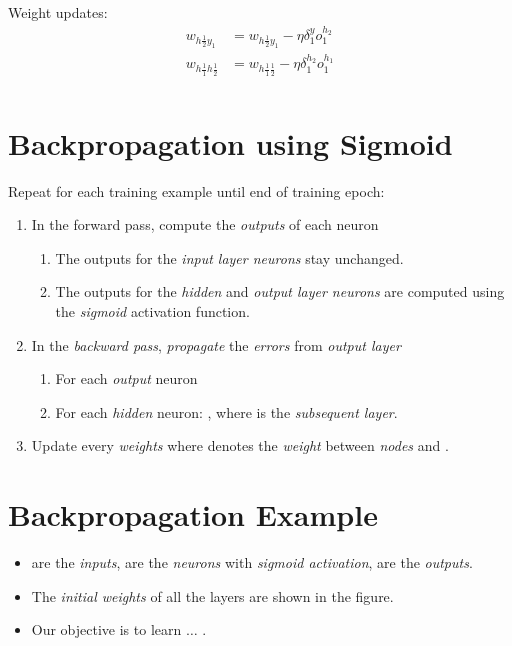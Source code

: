 \documentclass[
	number={8},
	title={Artificial Neural Network}
]{cs584notes}
\begin{document}
Weight updates:
\begin{equation*}
\begin{aligned}
	w_{h\frac{1}{2}y_{1}} &= w_{h\frac{1}{2}y_{1}} - \eta \delta_{1}^{y} o_{1}^{h_{2}}\\
	w_{h\frac{1}{1}h\frac{1}{2}} &= w_{h\frac{1}{1}\frac{1}{2}} - \eta \delta_{1}^{h_{2}} o_{1}^{h_{1}}\\
\end{aligned}
\end{equation*}

\section{Backpropagation using Sigmoid}\label{sec:backpropagation-using-sigmoid}
Repeat for each training example until end of training epoch:
\begin{enumerate}
	\item In the forward pass, compute the \emph{outputs}  of each neuron
	\begin{enumerate}
		\item The outputs for the \emph{input layer neurons} stay unchanged.
		\item The outputs for the \emph{hidden} and \emph{output layer neurons} are computed using the \emph{sigmoid} activation function.
	\end{enumerate}
	\item In the \emph{backward pass}, \emph{propagate} the \emph{errors} \data{$\delta$} from \emph{output layer}
	\begin{enumerate}
		\item For each \emph{output} neuron 
		\item For each \emph{hidden} neuron: , where  is the \emph{subsequent layer}.
	\end{enumerate}
	\item Update every \emph{weights}  where  denotes the \emph{weight} between \emph{nodes}  and .
\end{enumerate}

\section{Backpropagation Example}\label{sec:backpropagation-example}
\begin{itemize}
	\item {} are the \emph{inputs},  are the \emph{neurons} with \emph{sigmoid activation},  are the \emph{outputs}.
	\item The \emph{initial weights} of all the layers are shown in the figure.
	\item Our objective is to learn $\dots$ .
\end{itemize}
\end{document}
